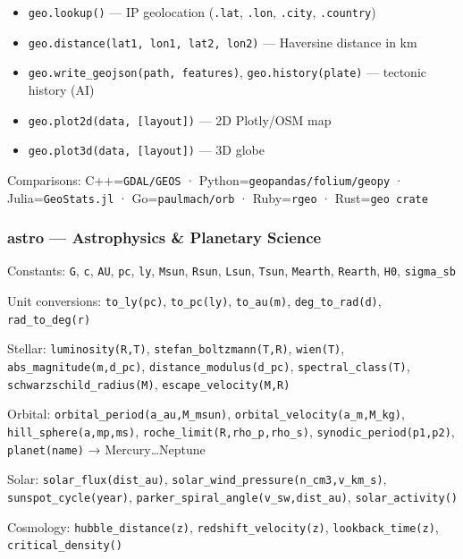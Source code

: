 \documentclass[
]{article}
\providecommand{\tightlist}{%
  \setlength{\itemsep}{0pt}\setlength{\parskip}{0pt}}
\begin{document}
\begin{itemize}
\tightlist
\item
  \texttt{geo.lookup()} --- IP geolocation (\texttt{.lat},
  \texttt{.lon}, \texttt{.city}, \texttt{.country})
\item
  \texttt{geo.distance(lat1,\ lon1,\ lat2,\ lon2)} --- Haversine
  distance in km
\item
  \texttt{geo.write\_geojson(path,\ features)},
  \texttt{geo.history(plate)} --- tectonic history (AI)
\item
  \texttt{geo.plot2d(data,\ {[}layout{]})} --- 2D Plotly/OSM map
\item
  \texttt{geo.plot3d(data,\ {[}layout{]})} --- 3D globe
\end{itemize}

Comparisons: C++=\texttt{GDAL/GEOS} ·
Python=\texttt{geopandas/folium/geopy} · Julia=\texttt{GeoStats.jl} ·
Go=\texttt{paulmach/orb} · Ruby=\texttt{rgeo} · Rust=\texttt{geo\ crate}

\subsubsection{astro --- Astrophysics \& Planetary
Science}\label{astro-astrophysics-planetary-science}

Constants: \texttt{G}, \texttt{c}, \texttt{AU}, \texttt{pc},
\texttt{ly}, \texttt{Msun}, \texttt{Rsun}, \texttt{Lsun}, \texttt{Tsun},
\texttt{Mearth}, \texttt{Rearth}, \texttt{H0}, \texttt{sigma\_sb}

Unit conversions: \texttt{to\_ly(pc)}, \texttt{to\_pc(ly)},
\texttt{to\_au(m)}, \texttt{deg\_to\_rad(d)}, \texttt{rad\_to\_deg(r)}

Stellar: \texttt{luminosity(R,T)}, \texttt{stefan\_boltzmann(T,R)},
\texttt{wien(T)}, \texttt{abs\_magnitude(m,d\_pc)},
\texttt{distance\_modulus(d\_pc)}, \texttt{spectral\_class(T)},
\texttt{schwarzschild\_radius(M)}, \texttt{escape\_velocity(M,R)}

Orbital: \texttt{orbital\_period(a\_au,M\_msun)},
\texttt{orbital\_velocity(a\_m,M\_kg)}, \texttt{hill\_sphere(a,mp,ms)},
\texttt{roche\_limit(R,rho\_p,rho\_s)}, \texttt{synodic\_period(p1,p2)},
\texttt{planet(name)} → Mercury\ldots Neptune

Solar: \texttt{solar\_flux(dist\_au)},
\texttt{solar\_wind\_pressure(n\_cm3,v\_km\_s)},
\texttt{sunspot\_cycle(year)},
\texttt{parker\_spiral\_angle(v\_sw,dist\_au)},
\texttt{solar\_activity()}

Cosmology: \texttt{hubble\_distance(z)}, \texttt{redshift\_velocity(z)},
\texttt{lookback\_time(z)}, \texttt{critical\_density()}
\end{document}
